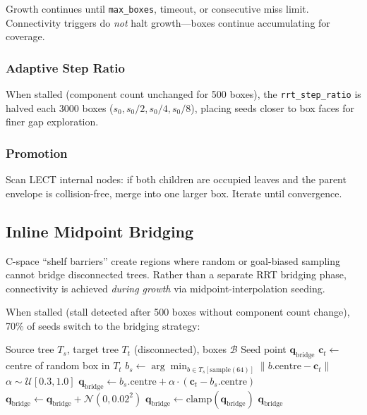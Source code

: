 \documentclass[journal]{IEEEtran}
\begin{document}
Growth continues until \texttt{max\_boxes}, timeout, or consecutive
miss limit.  Connectivity triggers do \emph{not} halt growth---boxes
continue accumulating for coverage.

\subsubsection{Adaptive Step Ratio}

When stalled (component count unchanged for 500 boxes), the
\texttt{rrt\_step\_ratio} is halved each 3000 boxes
($s_0, s_0/2, s_0/4, s_0/8$), placing seeds closer to box faces
for finer gap exploration.

\subsubsection{Promotion}

Scan LECT internal nodes: if both children are occupied leaves and
the parent envelope is collision-free, merge into one larger box.
Iterate until convergence.

\subsection{Inline Midpoint Bridging}\label{sec:bridge}

C-space ``shelf barriers'' create regions where random or
goal-biased sampling cannot bridge disconnected trees.
Rather than a separate RRT bridging phase, connectivity is achieved
\emph{during growth} via midpoint-interpolation seeding.

When stalled (stall detected after 500 boxes without component count change),
70\% of seeds switch to the bridging strategy:

\begin{algorithm}[t]
\caption{\texttt{midpoint\_bridge} --- Inline Bridging During Growth}
\label{alg:bridge}
\begin{algorithmic}[1]
\Require Source tree $T_s$, target tree $T_t$ (disconnected), boxes $\mathcal{B}$
\Ensure Seed point $\mathbf{q}_\text{bridge}$
\State $\mathbf{c}_t \leftarrow$ centre of random box in $T_t$
\State $b_s \leftarrow \arg\min_{b \in T_s[\text{sample}(64)]} \| b.\text{centre} - \mathbf{c}_t \|$
\State $\alpha \sim \mathcal{U}[0.3, 1.0]$ 
\State $\mathbf{q}_\text{bridge} \leftarrow b_s.\text{centre} + \alpha \cdot (\mathbf{c}_t - b_s.\text{centre})$
\State $\mathbf{q}_\text{bridge} \leftarrow \mathbf{q}_\text{bridge} + \mathcal{N}(0, 0.02^2)$ 
\State $\mathbf{q}_\text{bridge} \leftarrow \text{clamp}(\mathbf{q}_\text{bridge})$
\State \Return $\mathbf{q}_\text{bridge}$ 
\end{algorithmic}
\end{algorithm}
\end{document}

